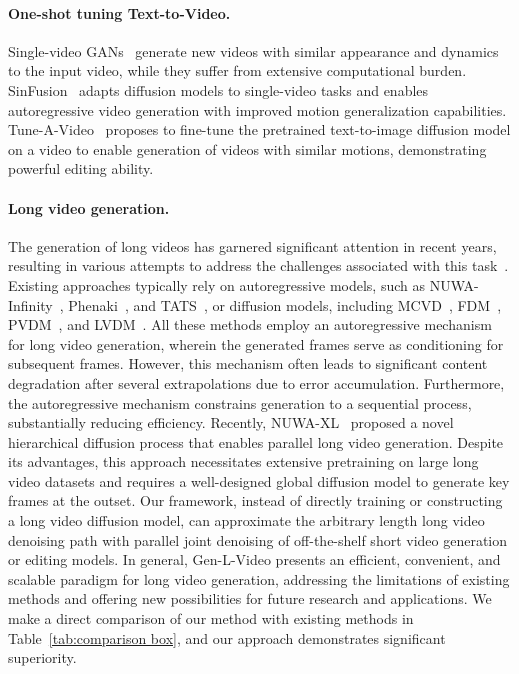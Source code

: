 \documentclass{article}
\begin{document}
\paragraph{One-shot tuning Text-to-Video.}
Single-video GANs~\cite{arora2021singan-gif,gur2020hierarchical} generate new videos with similar appearance and dynamics to the input video, while they suffer from extensive computational burden. SinFusion~\cite{nikankin2022sinfusion} adapts diffusion models to single-video tasks and enables autoregressive video generation with improved motion generalization capabilities. Tune-A-Video~\cite{wu2022tune} proposes to fine-tune the pretrained text-to-image diffusion model on a video to enable generation of videos with similar motions, demonstrating powerful editing ability. 
\paragraph{Long video generation.}\label{sec:long video generation}
The generation of long videos has garnered significant attention in recent years, resulting in various attempts to address the challenges associated with this task~\cite{voleti2022masked,yu2023video,harvey2022flexible,ge2022long,liang2022nuwa}. Existing approaches typically rely on autoregressive models, such as NUWA-Infinity~\cite{liang2022nuwa}, Phenaki~\cite{villegas2022phenaki}, and TATS~\cite{ge2022long}, or diffusion models, including MCVD~\cite{voleti2022masked}, FDM~\cite{harvey2022flexible}, PVDM~\cite{yu2023video}, and LVDM~\cite{he2022latent}. All these methods employ an autoregressive mechanism for long video generation, wherein the generated frames serve as conditioning for subsequent frames. However, this mechanism often leads to significant content degradation after several extrapolations due to error accumulation. Furthermore, the autoregressive mechanism constrains generation to a sequential process, substantially reducing efficiency. Recently, NUWA-XL~\cite{yin2023nuwa} proposed a novel hierarchical diffusion process that enables parallel long video generation. Despite its advantages, this approach necessitates extensive pretraining on large long video datasets and requires a well-designed global diffusion model to generate key frames at the outset.  Our framework, instead of directly training or constructing a long video diffusion model, can approximate the arbitrary length long video denoising path with parallel joint denoising of off-the-shelf short video generation or editing models. In general, Gen-L-Video presents an efficient, convenient, and scalable paradigm for long video generation, addressing the limitations of existing methods and offering new possibilities for future research and applications. We make a direct comparison of our method with existing methods in Table~\ref{tab:comparison box}, and our approach demonstrates significant superiority.
\end{document}
